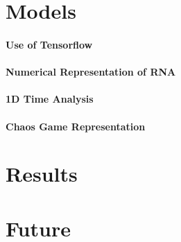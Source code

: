 \documentclass[12pt]{article}
\begin{document}
\section{Models}
\paragraph*{Use of Tensorflow}
\paragraph*{Numerical Representation of RNA}

\paragraph*{1D Time Analysis}
\paragraph*{Chaos Game Representation}

\section{Results}

\section{Future}



\end{document}
